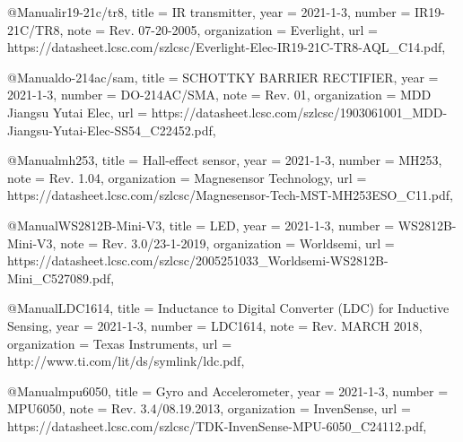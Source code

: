 @Manual{ir19-21c/tr8,
    title        = {IR transmitter},
    year         = {2021-1-3},
    number       = {IR19-21C/TR8},
    note         = {Rev. 07-20-2005},
    organization = {Everlight},
    url          = {https://datasheet.lcsc.com/szlcsc/Everlight-Elec-IR19-21C-TR8-AQL_C14\-.pdf},
}

@Manual{do-214ac/sam,
    title        = {SCHOTTKY BARRIER RECTIFIER},
    year         = {2021-1-3},
    number       = {DO-214AC/SMA},
    note         = {Rev. 01},
    organization = {MDD Jiangsu Yutai Elec},
    url          = {https://datasheet.lcsc.com/szlcsc/1903061001\-_\-MDD-Jiangsu-Yutai-Elec-SS54_C22452.pdf},
}   

@Manual{mh253,
    title        = {Hall-effect sensor},
    year         = {2021-1-3},
    number       = {MH253},
    note         = {Rev. 1.04},
    organization = {Magnesensor Technology},
    url          = {https://datasheet.lcsc.com/szlcsc/Magnesensor-Tech-MST-MH253ESO_C11\-.pdf},
}  

@Manual{WS2812B-Mini-V3,
    title        = {LED},
    year         = {2021-1-3},
    number       = {WS2812B-Mini-V3},
    note         = {Rev. 3.0/23-1-2019},
    organization = {Worldsemi},
    url          = {https://datasheet.lcsc.com/szlcsc/2005251033_Worldsemi-WS2812B-Mini_C527089.pdf},
}

@Manual{LDC1614,
    title        = {Inductance to Digital Converter (LDC) for Inductive Sensing},
    year         = {2021-1-3},
    number       = {LDC1614},
    note         = {Rev. MARCH 2018},
    organization = {Texas Instruments},
    url          = {http://www.ti.com/lit/ds/sym\-link\-/ldc\-.pdf},
}

@Manual{mpu6050,
    title        = {Gyro and Accelerometer},
    year         = {2021-1-3},
    number       = {MPU6050},
    note         = {Rev. 3.4/08.19.2013},
    organization = {InvenSense},
    url          = {https://datasheet.lcsc.com/szlcsc/TDK-InvenSense-MPU-6050\-_\-C24\-112.pdf},
}


